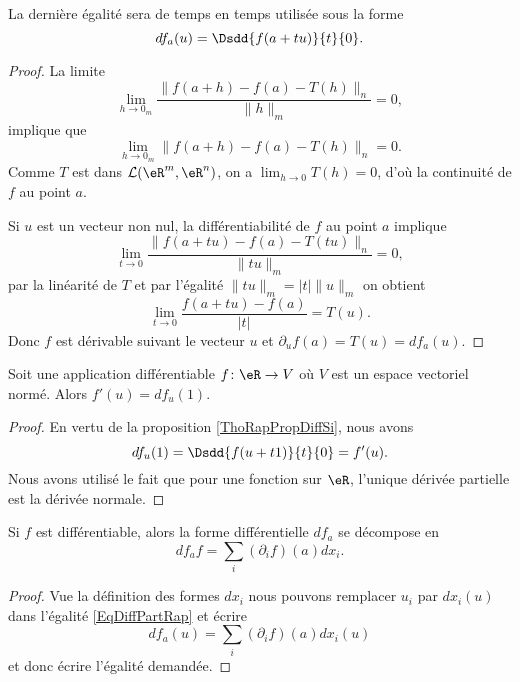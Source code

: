 La dernière égalité sera de temps en temps utilisée sous la forme
\begin{equation}    \label{EqOWQSoMA}
	df_a(u)=\Dsdd{ f(a+tu) }{t}{0}.
\end{equation}

\begin{proof}
	La limite
	\[
		\lim_{h\to 0_m}\frac{\|f(a+h)-f(a)-T(h)\|_n}{\|h\|_m}=0,
	\]
	implique que
	\[
		\lim_{h\to 0_m}\|f(a+h)-f(a)-T(h)\|_n=0.
	\]
	Comme \( T\) est dans \( \mathcal{L}(\eR^m,\eR^n)\), on a \( \lim_{h\to 0}T(h)=0\), d'où la continuité de \( f\) au point \( a\).

	Si \( u\) est un vecteur non nul, la différentiabilité de \( f\) au point \( a\) implique
	\[
		\lim_{t\to 0}\frac{\|f(a+tu)-f(a)-T(tu)\|_n}{\|tu\|_m}=0,
	\]
	par la linéarité de \( T\) et par l'égalité \( \|tu\|_m=|t|\|u\|_m\) on obtient
	\[
		\lim_{t\to 0}\frac{f(a+tu)-f(a)}{|t|}= T(u).
	\]
	Donc \( f\) est dérivable suivant le vecteur \( u\) et \( \partial_uf(a)=T(u)=df_a(u)\).
\end{proof}

\begin{corollary}       \label{CORooTBUMooHPncPH}
	Soit une application différentiable \( f\colon \eR\to V\) où \( V\) est un espace vectoriel normé. Alors \( f'(u)=df_u(1)\).
\end{corollary}

\begin{proof}
	En vertu de la proposition \ref{ThoRapPropDiffSi}, nous avons
	\begin{equation}
		df_u(1)=\Dsdd{ f(u+t1) }{t}{0}=f'(u).
	\end{equation}
	Nous avons utilisé le fait que pour une fonction sur \( \eR\), l'unique dérivée partielle est la dérivée normale.
\end{proof}

\begin{corollary}       \label{CORooXURPooQMKvBl}
	Si \( f\) est différentiable, alors la forme différentielle \( df_a\) se décompose en
	\begin{equation}
		df_af=\sum_i(\partial_if)(a)dx_i.
	\end{equation}
\end{corollary}

\begin{proof}
	Vue la définition des formes \( dx_i\) nous pouvons remplacer \( u_i\) par \( dx_i(u)\) dans l'égalité \eqref{EqDiffPartRap} et écrire
	\begin{equation}
		df_a(u)=\sum_i(\partial_if)(a)dx_i(u)
	\end{equation}
	et donc écrire l'égalité demandée.
\end{proof}

